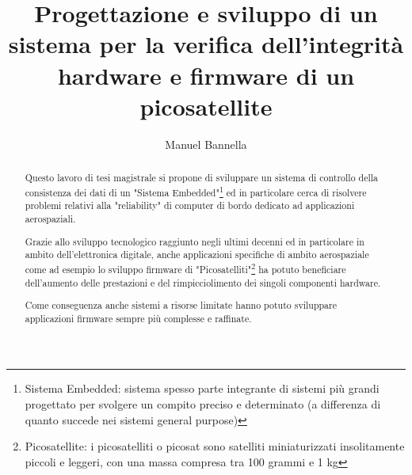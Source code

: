 \documentclass[LaM,binding=0.6cm]{../sapthesis}
\title{Progettazione e sviluppo di un sistema per la verifica
dell’integrità hardware e
firmware di un picosatellite}
\author{Manuel Bannella}
\begin{document}
\frontmatter

\maketitle

\dedication{Dedicato a\\ Francesco Savi}

\begin{abstract}


Questo lavoro di tesi magistrale si propone di sviluppare un sistema di controllo della consistenza dei dati di un "Sistema Embedded"\footnote{Sistema Embedded: sistema spesso parte integrante di sistemi più grandi progettato per svolgere un compito preciso e determinato (a differenza di quanto succede nei sistemi general purpose)} ed in particolare cerca di risolvere problemi relativi alla "reliability" di computer di bordo dedicato ad applicazioni aerospaziali.

Grazie allo sviluppo tecnologico raggiunto negli ultimi decenni ed in particolare in ambito dell'elettronica digitale, anche applicazioni specifiche di ambito aerospaziale come ad esempio lo sviluppo firmware di "Picosatelliti"\footnote{Picosatellite: i picosatelliti o picosat sono satelliti miniaturizzati insolitamente piccoli e leggeri, con una massa compresa tra 100 grammi e 1 kg} ha potuto beneficiare dell'aumento delle prestazioni e del rimpicciolimento dei singoli componenti hardware. 

Come conseguenza anche sistemi a risorse limitate hanno potuto sviluppare applicazioni firmware sempre più complesse e raffinate.


\end{abstract}
\end{document}
